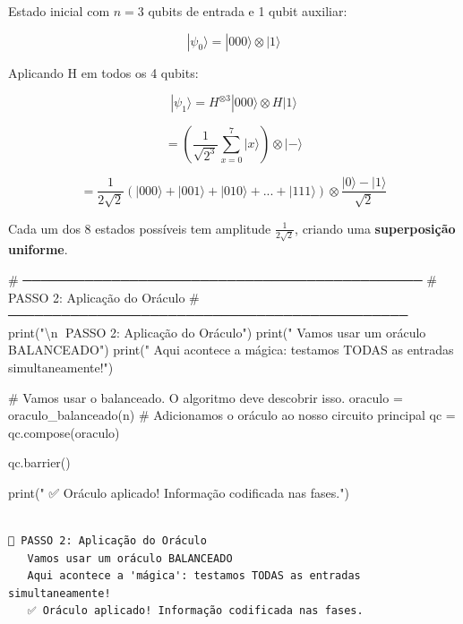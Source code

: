 \documentclass[
  brazilian,
]{report}
\newenvironment{Shaded}{\begin{snugshade}}{\end{snugshade}}
\newcommand{\NormalTok}[1]{\textcolor[rgb]{0.00,0.23,0.31}{#1}}
\begin{document}
Estado inicial com \(n=3\) qubits de entrada e 1 qubit auxiliar:

\[|\psi_0\rangle = |000\rangle \otimes |1\rangle\]

Aplicando H em todos os 4 qubits:

\[|\psi_1\rangle = H^{\otimes 3}|000\rangle \otimes H|1\rangle\]

\[= \left(\frac{1}{\sqrt{2^3}} \sum_{x=0}^{7} |x\rangle\right) \otimes |-\rangle\]

\[= \frac{1}{2\sqrt{2}} (|000\rangle + |001\rangle + |010\rangle + ... + |111\rangle) \otimes \frac{|0\rangle - |1\rangle}{\sqrt{2}}\]

Cada um dos 8 estados possíveis tem amplitude \(\frac{1}{2\sqrt{2}}\),
criando uma \textbf{superposição uniforme}.

\begin{Shaded}
\begin{Highlighting}[]


\NormalTok{\# ─────────────────────────────────────────────}
\NormalTok{\# PASSO 2: Aplicação do Oráculo}
\NormalTok{\# ─────────────────────────────────────────────}
\NormalTok{print("\textbackslash{}n📍 PASSO 2: Aplicação do Oráculo")}
\NormalTok{print("   Vamos usar um oráculo BALANCEADO")}
\NormalTok{print("   Aqui acontece a \textquotesingle{}mágica\textquotesingle{}: testamos TODAS as entradas simultaneamente!")}

\NormalTok{\# Vamos usar o balanceado. O algoritmo deve descobrir isso.}
\NormalTok{oraculo = oraculo\_balanceado(n)}
\NormalTok{\# Adicionamos o oráculo ao nosso circuito principal}
\NormalTok{qc = qc.compose(oraculo)}

\NormalTok{qc.barrier()}

\NormalTok{print("   ✅ Oráculo aplicado! Informação codificada nas fases.")}
\end{Highlighting}
\end{Shaded}

\begin{verbatim}

📍 PASSO 2: Aplicação do Oráculo
   Vamos usar um oráculo BALANCEADO
   Aqui acontece a 'mágica': testamos TODAS as entradas simultaneamente!
   ✅ Oráculo aplicado! Informação codificada nas fases.
\end{verbatim}
\end{document}
